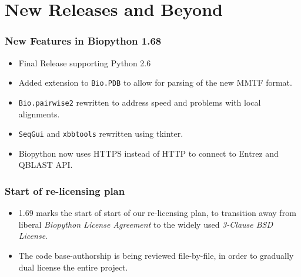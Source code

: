 \documentclass[trans]{beamer}
\begin{document}

\section{New Releases and Beyond}
\frame
{
}
\frame
{
  \frametitle{New Features in Biopython 1.68}

  \begin{itemize}
  \item Final Release supporting Python 2.6
  \item Added extension to \texttt{Bio.PDB} to allow for parsing of the new MMTF format.
  \item \texttt{Bio.pairwise2} rewritten to address speed and problems with local alignments.
  \item \texttt{SeqGui} and \texttt{xbbtools} rewritten using tkinter.
  \item Biopython now uses HTTPS instead of HTTP to connect to Entrez and QBLAST API.
  \end{itemize}

}
\frame
{
}
\frame
{
  \frametitle{Start of re-licensing plan}

  \begin{itemize}
  \item 1.69 marks the start of start of our re-licensing plan, to transition away
from liberal \emph{Biopython License Agreement} to the widely used \emph{3-Clause BSD License}.
\item The code base-authorship is being reviewed file-by-file, in order to gradually dual license the entire
project.
  \end{itemize}

}
\end{document}
